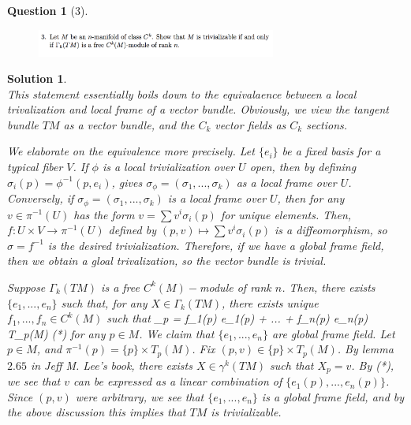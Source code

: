 \documentclass{article} %
\def\eQb#1\eQe{\begin{eqnarray*}#1\end{eqnarray*}}
\theoremstyle{quest}
\newtheorem*{question}{Question}
\newtheorem*{solution}{Solution}
\begin{document}
\begin{question}[3]
\hfill
\begin{figure}[h!]
  \centering
    \includegraphics[width=0.7\textwidth]{DG-e3-p3.png}
\end{figure}
\end{question}
\begin{solution} \hfill \\
This statement essentially boils down to the equivalaence between a local
trivalization and local frame of a vector bundle. Obviously, we view the
tangent bundle $TM$ as a vector bundle, and the $C_k$ vector fields as
$C_k$ sections. 

\bigskip

We elaborate on the equivalence more precisely. Let $\{e_i\}$ be a fixed basis
for a typical fiber $V$. 
If $\phi$
is a local trivialization over $U$ open, then by defining 
$\sigma_i(p) = \phi^{-1}(p,e_i)$, gives $\sigma_{\phi} = (\sigma_1,...,\sigma_k)$
as a local frame over $U$. Conversely, if $\sigma_{\phi} = (\sigma_1,...,\sigma_k)$
is a local frame over $U$, then for any $v \in \pi^{-1}(U)$ has the form $v
= \sum v^{i} \sigma_{i}(p)$ for unique elements. Then, $f:U \times V \to \pi^{-1}
(U)$ defined by $(p,v) \mapsto \sum v^{i} \sigma_i(p)$ is a diffeomorphism, so 
$\sigma = f^{-1}$ is the desired trivialization. Therefore, if we have a global 
frame field, then we obtain a gloal trivalization, so the vector bundle is 
trivial.  

\bigskip 

Suppose $\Gamma_{k}(TM)$ is a free $C^k(M)-$module of rank $n$. Then,
there exists $\{e_1, ..., e_n\}$ such that, for any $ X \in \Gamma_k(TM)$,
there exists unique $f_1,...,f_n \in C^k(M)$ such that  
\eQb
X_p = f_1(p) e_1(p) + ... + f_n(p) e_n(p) \in T_{p}(M) \>\>\> (*)
\eQe 
for any $p \in M$. We claim that $\{e_1,...,e_n\}$ are global frame field. Let 
$p \in M$, and $\pi^{-1}(p) = \{p\} \times T_{p}(M)$. Fix $(p,v) \in \{p\} 
\times T_{p}(M)$. By lemma $2.65$ in Jeff M. Lee's book, there exists $X \in 
\gamma^{k}(TM)$ such that $X_p = v$. By (*), we see that $v$ can be
expressed as a linear combination of $\{e_1(p), ..., e_n(p)\}$. Since $(p,v)$
were arbitrary, we see that $\{e_1, ..., e_n\}$ is a global frame field, and
by the above discussion this implies that $TM$ is trivializable. 

\bigskip




\end{solution}
\end{document}
